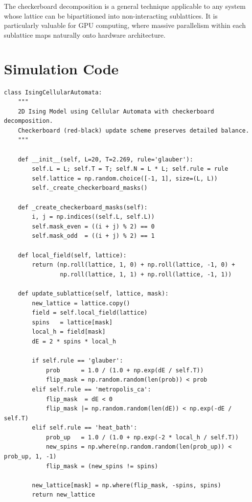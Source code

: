 \documentclass[11pt,a4paper]{article}
\begin{document}
The checkerboard decomposition is a general technique applicable to any
system whose lattice can be bipartitioned into non-interacting sublattices.
It is particularly valuable for GPU computing, where massive parallelism
within each sublattice maps naturally onto hardware architecture.

\appendix
\section{Simulation Code}
\label{app:code}

\begin{lstlisting}[caption={Core class and main simulation loop from \texttt{01\_ising\_cellular\_automata.py}.}]
class IsingCellularAutomata:
    """
    2D Ising Model using Cellular Automata with checkerboard decomposition.
    Checkerboard (red-black) update scheme preserves detailed balance.
    """

    def __init__(self, L=20, T=2.269, rule='glauber'):
        self.L = L; self.T = T; self.N = L * L; self.rule = rule
        self.lattice = np.random.choice([-1, 1], size=(L, L))
        self._create_checkerboard_masks()

    def _create_checkerboard_masks(self):
        i, j = np.indices((self.L, self.L))
        self.mask_even = ((i + j) % 2) == 0
        self.mask_odd  = ((i + j) % 2) == 1

    def local_field(self, lattice):
        return (np.roll(lattice, 1, 0) + np.roll(lattice, -1, 0) +
                np.roll(lattice, 1, 1) + np.roll(lattice, -1, 1))

    def update_sublattice(self, lattice, mask):
        new_lattice = lattice.copy()
        field = self.local_field(lattice)
        spins   = lattice[mask]
        local_h = field[mask]
        dE = 2 * spins * local_h

        if self.rule == 'glauber':
            prob      = 1.0 / (1.0 + np.exp(dE / self.T))
            flip_mask = np.random.random(len(prob)) < prob
        elif self.rule == 'metropolis_ca':
            flip_mask  = dE < 0
            flip_mask |= np.random.random(len(dE)) < np.exp(-dE / self.T)
        elif self.rule == 'heat_bath':
            prob_up   = 1.0 / (1.0 + np.exp(-2 * local_h / self.T))
            new_spins = np.where(np.random.random(len(prob_up)) < prob_up, 1, -1)
            flip_mask = (new_spins != spins)

        new_lattice[mask] = np.where(flip_mask, -spins, spins)
        return new_lattice


\end{lstlisting}
\end{document}
